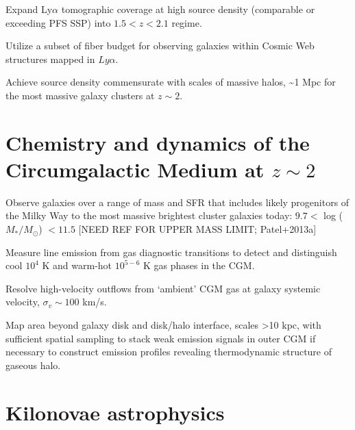 \documentclass[11pt,a4paper,twoside,onecolumn,openany,final,oldfontcommands]{memoir}
\begin{document}

\begin{programrequirement}
\reqitem Expand Ly$\alpha$ tomographic coverage at high source density (comparable or exceeding PFS SSP) into $1.5 < z < 2.1$ regime.

\reqitem Utilize a subset of fiber budget for observing galaxies within Cosmic Web structures mapped in $Ly\alpha$.

\reqitem Achieve source density commensurate with scales of massive halos, \sim 1 Mpc for the most massive galaxy clusters at $z\sim2$.
\end{programrequirement}

\section{Chemistry and dynamics of the Circumgalactic Medium at $z\sim2$}
\begin{programrequirement}
\reqitem Observe galaxies over a range of mass and SFR that includes likely progenitors of the Milky Way to the most massive brightest cluster galaxies today: $9.7 <$ log ($M_*/M_\odot$) $< 11.5$ [NEED REF FOR UPPER MASS LIMIT; Patel+2013a]

\reqitem Measure line emission from gas diagnostic transitions to detect and distinguish cool $10^4$ K and warm-hot $10^{5-6}$ K gas phases in the CGM.

\reqitem Resolve high-velocity outflows from `ambient' CGM gas at galaxy systemic velocity, $\sigma_v \sim 100$ km/s.  

\reqitem Map area beyond galaxy disk and disk/halo interface, scales >10 kpc, with sufficient spatial sampling to stack weak emission signals in outer CGM if necessary to construct emission profiles revealing thermodynamic structure of gaseous halo.  

\end{programrequirement}


\section{Kilonovae astrophysics}
\end{document}

